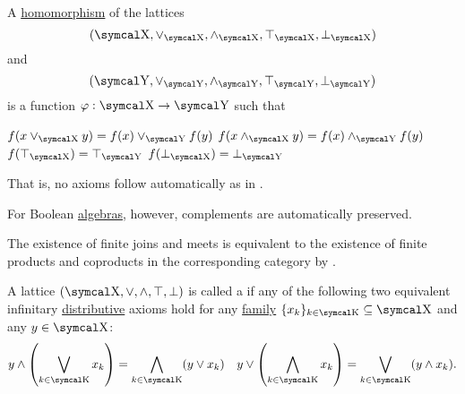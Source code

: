 \begin{Proposition}\label{thm:lattice_homomorphism}
  A \hyperref[def:first_order_homomorphism]{homomorphism} of the lattices
  \begin{equation*}
    (\CX, \vee_{\CX}, \wedge_{\CX}, \top_{\CX}, \bot_{\CX})
  \end{equation*}
  and
  \begin{equation*}
    (\CY, \vee_{\CY}, \wedge_{\CY}, \top_{\CY}, \bot_{\CY})
  \end{equation*}
  is a function \( \varphi: \CX \to \CY \) such that
  \begin{PropEnum}
     \( f(x \vee_{\CX} y) = f(x) \vee_{\CY} f(y) \)
     \( f(x \wedge_{\CX} y) = f(x) \wedge_{\CY} f(y) \)
     \( f(\top_{\CX}) = \top_{\CY} \)
     \( f(\bot_{\CX}) = \bot_{\CY} \)
  \end{PropEnum}

  That is, no axioms follow automatically as in .

  For Boolean \hyperref[def:boolean_algebra]{algebras}, however, complements are automatically preserved.
\end{Proposition}

\begin{Remark}\label{def:lattice_categorical_product}
  The existence of finite joins and meets is equivalent to the existence of finite products and coproducts in the corresponding category by .
\end{Remark}

\begin{Definition}\label{def:distributive_lattice}\cite{nLab:distributive_lattice}
  A lattice \( (\CX, \vee, \wedge, \top, \bot) \) is called a  if any of the following two equivalent infinitary \hyperref[def:algebraic_theory/distributivity]{distributive} axioms hold for any \hyperref[def:indexed_family]{family} \( \{ x_k \}_{k \in \CK} \subseteq \CX \) and any \( y \in \CX \):
  \begin{align*}
    y \wedge \left( \bigvee_{k \in \CK} x_k \right) = \bigwedge_{k \in \CK} (y \vee x_k)
    &&
    y \vee \left( \bigwedge_{k \in \CK} x_k \right) = \bigvee_{k \in \CK} (y \wedge x_k).
  \end{align*}
\end{Definition}


